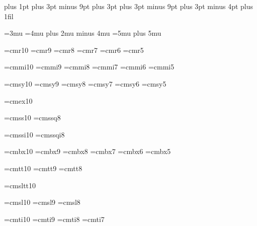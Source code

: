 \parskip=0pt plus 1pt
\abovedisplayskip=12pt plus 3pt minus 9pt
\abovedisplayshortskip=0pt plus 3pt
\belowdisplayskip=12pt plus 3pt minus 9pt
\belowdisplayshortskip=7pt plus 3pt minus 4pt
\topskip=10pt
\splittopskip=10pt
\parfillskip=0pt plus 1fil

\thinmuskip=3mu
\medmuskip=4mu plus 2mu minus 4mu
\thickmuskip=5mu plus 5mu



\def\magstephalf{1095 }
\def\magstep#1{\ifcase#1 \@m\or 1200\or 1440\or 1728\or 2074\or 2488\fi\relax}



\font\tenrm=cmr10 %
\font\preloaded=cmr9
\font\preloaded=cmr8
\font\sevenrm=cmr7
\font\preloaded=cmr6
\font\fiverm=cmr5

\font\teni=cmmi10 %
\font\preloaded=cmmi9
\font\preloaded=cmmi8
\font\seveni=cmmi7
\font\preloaded=cmmi6
\font\fivei=cmmi5

\font\tensy=cmsy10 %
\font\preloaded=cmsy9
\font\preloaded=cmsy8
\font\sevensy=cmsy7
\font\preloaded=cmsy6
\font\fivesy=cmsy5

\font\tenex=cmex10 %

\font\preloaded=cmss10 %
\font\preloaded=cmssq8

\font\preloaded=cmssi10 %
\font\preloaded=cmssqi8

\font\tenbf=cmbx10 %
\font\preloaded=cmbx9
\font\preloaded=cmbx8
\font\sevenbf=cmbx7
\font\preloaded=cmbx6
\font\fivebf=cmbx5

\font\tentt=cmtt10 %
\font\preloaded=cmtt9
\font\preloaded=cmtt8

\font\preloaded=cmsltt10 %

\font\tensl=cmsl10 %
\font\preloaded=cmsl9
\font\preloaded=cmsl8

\font\tenit=cmti10 %
\font\preloaded=cmti9
\font\preloaded=cmti8
\font\preloaded=cmti7

